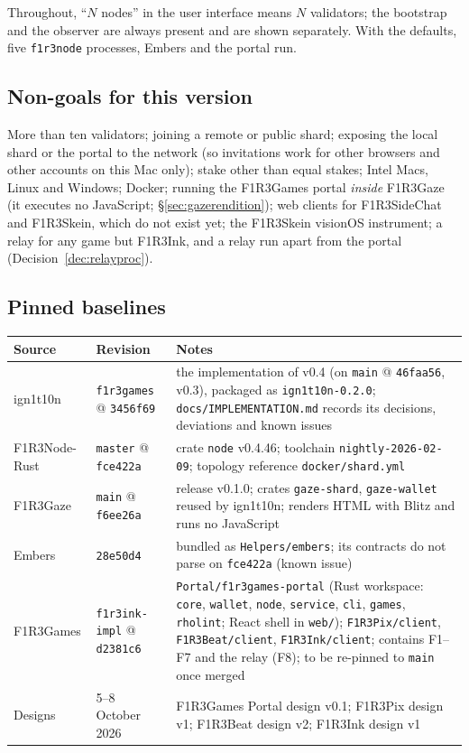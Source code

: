 \documentclass[11pt]{article}
\theoremstyle{definition}
\theoremstyle{remark}
\newcommand{\code}[1]{\texttt{#1}}
\newcommand{\Gz}{F1R3Gaze}
\newcommand{\Hr}{ign1t10n}
\newcommand{\Nd}{F1R3Node-Rust}
\newcommand{\Gm}{F1R3Games}
\newcommand{\Em}{Embers}
\begin{document}
\noindent
Throughout, ``$N$ nodes'' in the user interface means $N$ validators; the bootstrap
and the observer are always present and are shown separately. With the defaults,
five \code{f1r3node} processes, \Em{} and the portal run.

\subsection{Non-goals for this version}

More than ten validators; joining a remote or public shard; exposing the local shard
or the portal to the network (so invitations work for other browsers and other
accounts on this Mac only); stake other than equal stakes; Intel Macs, Linux and
Windows; Docker; running the \Gm{} portal \emph{inside} \Gz{} (it executes no
JavaScript; \S\ref{sec:gazerendition}); web clients for F1R3SideChat and F1R3Skein,
which do not exist yet; the F1R3Skein visionOS instrument; a relay for any game but
F1R3Ink, and a relay run apart from the portal (Decision~\ref{dec:relayproc}).

\subsection{Pinned baselines}

\begin{center}\small
\renewcommand{\arraystretch}{1.15}
\begin{tabularx}{\linewidth}{@{}p{2.6cm}p{3.0cm}X@{}}
\toprule
Source & Revision & Notes\\
\midrule
\Hr{} & \code{f1r3games} @ \code{3456f69} & the implementation of v0.4 (on \code{main} @ \code{46faa56}, v0.3), packaged as \code{ign1t10n-0.2.0}; \code{docs/IMPLEMENTATION.md} records its decisions, deviations and known issues\\
\Nd{} & \code{master} @ \code{fce422a} & crate \code{node} v0.4.46; toolchain \code{nightly-2026-02-09}; topology reference \code{docker/shard.yml}\\
\Gz{} & \code{main} @ \code{f6ee26a} & release v0.1.0; crates \code{gaze-shard}, \code{gaze-wallet} reused by \Hr{}; renders HTML with Blitz and runs no JavaScript\\
\Em{} & \code{28e50d4} & bundled as \code{Helpers/embers}; its contracts do not parse on \code{fce422a} (known issue)\\
\Gm{} & \code{f1r3ink-impl} @ \code{d2381c6} & \code{Portal/f1r3games-portal} (Rust workspace: \code{core}, \code{wallet}, \code{node}, \code{service}, \code{cli}, \code{games}, \code{rholint}; React shell in \code{web/}); \code{F1R3Pix/client}, \code{F1R3Beat/client}, \code{F1R3Ink/client}; contains F1--F7 and the relay (F8); to be re-pinned to \code{main} once merged\\
Designs & 5--8 October 2026 & \Gm{} Portal design v0.1; F1R3Pix design v1; F1R3Beat design v2; F1R3Ink design v1\\
\bottomrule
\end{tabularx}
\end{center}
\end{document}
